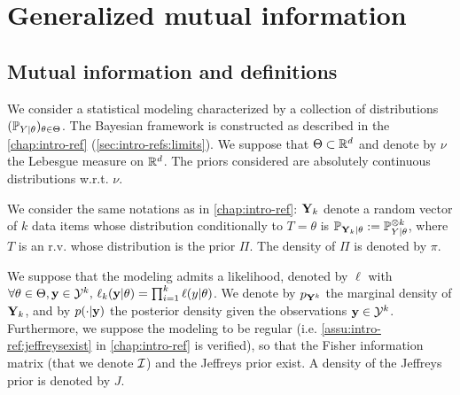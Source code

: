 \section{Generalized mutual information}\label{sec:PSGSA:genMI}

\subsection{Mutual information and definitions}


We consider a statistical modeling characterized by a collection of distributions $(\mathbb{P}_{Y|\theta})_{\theta\in\Theta}$. 
The Bayesian framework is constructed as described in the \cref{chap:intro-ref} (\cref{sec:intro-refs:limits}). We suppose that $\Theta\subset\mathbb{R}^d$ and denote by $\nu$ the Lebesgue measure on $\mathbb{R}^d$. 
The priors considered are absolutely continuous distributions w.r.t. $\nu$.

We consider the same notations as in \cref{chap:intro-ref}: $\mathbf{Y}_k$ denote a random vector of $k$ data items whose distribution conditionally to $T=\theta$ is $\mathbb{P}_{\mathbf{Y}_k|\theta}:=\mathbb{P}_{Y|\theta}^{\otimes k}$, where $T$ is an r.v. whose distribution is the prior $\varPi$. The density of $\varPi$ is denoted by $\pi$.

We suppose that the modeling admits a likelihood, denoted by $\ell$ with $\forall\theta\in\Theta,\mathbf{y}\in\mathcal{Y}^k,\, \ell_k(\mathbf{y}|\theta)=\prod_{i=1}^k\ell(y|\theta) $. We denote by $p_{\mathbf{Y}^k}$ the marginal density of $\mathbf{Y}_k$, and by $p(\cdot|\mathbf{y})$ the posterior density given the observations $\mathbf{y}\in\mathcal{Y}^k$. %
Furthermore, we suppose the modeling to be regular (i.e. \cref{assu:intro-ref:jeffreysexist} in \cref{chap:intro-ref} is verified), so that the Fisher information matrix (that we denote $\mathcal{I}$) and the Jeffreys prior exist. A density of the Jeffreys prior is denoted by $J$.



